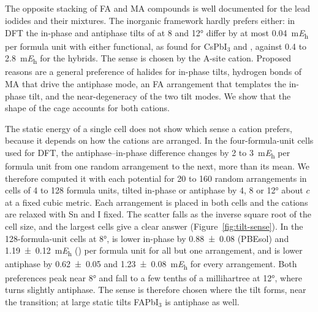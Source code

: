 \subsection{\protect{}}
\label{sec:res-sense}
{\changedcolor
The opposite stacking of FA and MA compounds is well documented for the lead iodides and their
mixtures.\cite{Fabini2016Angew, Hainer2025NatCommun, Dubajic2025NatNano} The inorganic framework hardly prefers
either: in DFT the in-phase and antiphase tilts of \CsSnI{} at 8 and \ang{12} differ by at most
\SI{0.04}{\milli\hartree} per formula unit with either functional, as found for CsPbI$_3$ and
\CsSnI{},\cite{Klarbring2019PRB} against 0.4 to \SI{2.8}{\milli\hartree} for the hybrids. The sense is chosen by the
A-site cation. Proposed reasons are a general preference of halides for in-phase tilts,\cite{Young2016JPCL} hydrogen
bonds of MA that drive the antiphase mode,\cite{Lee2016ChemMater} an FA arrangement that templates the in-phase
tilt,\cite{Senno2021PCCP} and the near-degeneracy of the two tilt modes.\cite{Hainer2025NatCommun} We show that the
shape of the cage accounts for both cations.

The static energy of a single cell does not show which sense a cation prefers, because it depends on how the cations
are arranged. In the four-formula-unit cells used for DFT, the antiphase--in-phase difference changes by 2 to
\SI{3}{\milli\hartree} per formula unit from one random arrangement to the next, more than its mean. We therefore
computed it with each potential for 20 to 160 random arrangements in cells of 4 to 128 formula units, tilted in-phase
or antiphase by 4, 8 or \ang{12} about $c$ at a fixed cubic metric. Each arrangement is placed in both cells and the
cations are relaxed with Sn and I fixed. The scatter falls as the inverse square root of the cell size, and the
largest cells give a clear answer (Figure~\ref{fig:tilt-sense}). In the 128-formula-unit cells at \ang{8},
\FASnI{} is lower in-phase by \num{0.88 \pm 0.08} (PBEsol) and \SI{1.19 \pm 0.12}{\milli\hartree} (\rSCAN{}) per
formula unit for all but one arrangement, and \MASnI{} is lower antiphase by \num{0.62 \pm 0.05} and
\SI{1.23 \pm 0.08}{\milli\hartree} for every arrangement. Both preferences peak near \ang{8} and fall to a few tenths of a
millihartree at \ang{12}, where \FASnI{} turns slightly antiphase. The sense is therefore chosen where the tilt forms,
near the transition; at large static tilts FAPbI$_3$ is antiphase as well.\cite{Dutta2025JACS}

}
